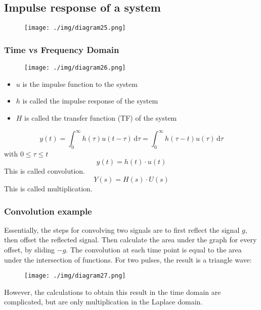 \subsection{Impulse response of a system}
\begin{figure}[H]
  \centering
  \texttt{[image: ./img/diagram25.png]}
\end{figure}
\subsubsection{Time vs Frequency Domain}
\begin{figure}[H]
  \centering
  \texttt{[image: ./img/diagram26.png]}
\end{figure}
\begin{itemize}
  \item $u$ is the impulse function to the system
  \item $h$ is called the impulse response of the system
  \item $H$ is called the transfer function (TF) of the system
\end{itemize}
\begin{equation}
  y(t) = \int_{0}^{\infty} h(\tau) u (t-\tau) \,\mathrm{d}\tau = \int_{0}^{\infty} h(\tau - t)u(\tau) \,\mathrm{d}\tau
\end{equation}
with $0\leq \tau \leq t$
\begin{equation}
  y(t) = h(t) \cdot u(t)
\end{equation}
This is called convolution.
\begin{equation}
  Y(s) = H(s) \cdot U(s)
\end{equation}
This is called multiplication.
\subsubsection{Convolution example}
Essentially, the steps for convolving two signals are to first reflect the signal $g$, then offset the reflected signal. Then calculate the area under the graph for every offset, by sliding $-g$. The convolution at each time point is equal to the area under the intersection of functions. For two pulses, the result is a triangle wave:
\begin{figure}[H]
  \centering
  \texttt{[image: ./img/diagram27.png]}
\end{figure}
However, the calculations to obtain this result in the time domain are complicated, but are only multiplication in the Laplace domain.
